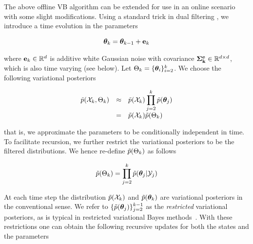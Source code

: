 \documentclass[12pt]{article}
\begin{document}

The above offline VB algorithm can be extended for use in an online scenario with some slight
modifications. Using a standard trick in dual filtering \cite{Haykin_2001}, we introduce a time
evolution in the parameters

\begin{equation}\label{eq:thetaevolve} \thetabk = \thetabkk + \ek \end{equation}

\noindent where ${\bf e}_k \in \mathbb{R}^d$ is additive white Gaussian noise with covariance ${\bf \Sigma^{e}_{k}} \in
\mathbb{R}^{d\times d}$, which is also time varying (see below). Let $\Theta_k = \{{\bm \theta}_i\}_{i=2}^{k}$.
We choose the following variational posteriors

\begin{equation} \begin{array}{rcl} \tilde{p}(\mathcal{X}_k,\Theta_k) &\approx& \tilde{p}(\mathcal{X}_k) \displaystyle \prod_{j=2}^k
	\tilde{p}({\bm \theta}_{j}) \\[1ex] &=& \tilde{p}(\mathcal{X}_k)\tilde{p}(\Theta_k) \\ \end{array} \end{equation}

\noindent that is, we approximate the parameters to be conditionally independent in time. To
facilitate recursion, we further restrict the variational posteriors to be the filtered
distributions. We hence re-define $\tilde{p}(\Theta_k)$ as follows

\begin{equation}\label{eq:restriction} \pt(\Theta_k) = \displaystyle \prod_{j=2}^k
	\pt(\thetab_{j}|\Y_j) \end{equation}

At each time step the distribution $\tilde{p}(\mathcal{X}_k)$ and $\tilde{p}({\bm \theta}_{k})$ are variational posteriors in
the conventional sense. We refer to $\{\tilde{p}({\bm \theta}_{j})\}_{j=2}^{k-1}$ as the \emph{restricted}
variational posteriors, as is typical in restricted variational Bayes methods~\cite{Smidl_2006b}.
With these restrictions one can obtain the following recursive updates for both the states and the
parameters
\end{document}
